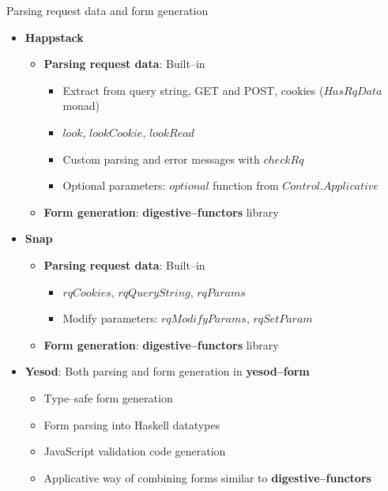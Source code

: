 \documentclass[10pt,usenames,dvipsnames]{beamer}
\begin{document}
	\begin{frame}{Parsing request data and form generation}
		\begin{itemize}
		\item \textbf{Happstack}
		\begin{itemize}
			\item  \textbf{Parsing request data}: Built--in
			\begin{itemize}
				\item Extract from query string, GET and POST, cookies ($ HasRqData $ monad)
				\item $ look $, $ lookCookie $, $ lookRead $
				\item Custom parsing and error messages with $ checkRq $
				\item Optional parameters: $ optional $ function from $ Control.Applicative $
			\end{itemize}
			\item  \textbf{Form generation}: \textbf{digestive--functors} library
		\end{itemize}
		\item\textbf{Snap}
		\begin{itemize}
			\item  \textbf{Parsing request data}: Built--in
			\begin{itemize}
				\item $ rqCookies $, $ rqQueryString $, $ rqParams $
				\item Modify parameters: $ rqModifyParams  $, $ rqSetParam $
			\end{itemize}
			\item  \textbf{Form generation}: \textbf{digestive--functors} library
		\end{itemize}
		\item \textbf{Yesod}: Both parsing and form generation in \textbf{yesod--form}
		\begin{itemize}
				\item Type--safe form generation
				\item Form parsing into Haskell datatypes
				\item JavaScript validation code generation
				\item Applicative way of combining forms similar to \textbf{digestive--functors}
			\end{itemize}
		\end{itemize}
	\end{frame}	
\end{document}
